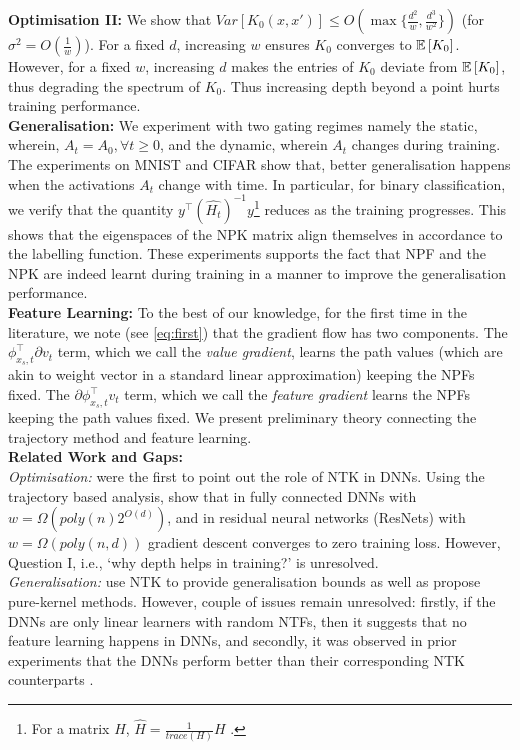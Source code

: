 \textbf{Optimisation II:} We show that $Var\left[K_0(x,x')\right]\leq O(\max\{\frac{d^2}{w}, \frac{d^3}{w^2}\})$ (for $\sigma^2=O(\frac{1}w)$). For a fixed $d$, increasing $w$ ensures $K_0$ converges to $\mathbb{E}\left[K_0\right]$. However, for a fixed $w$, increasing $d$ makes the entries of $K_0$ deviate from $\mathbb{E}\left[K_0\right]$, thus degrading the spectrum of $K_0$. Thus increasing depth beyond a point hurts training performance. \hfill\\
\textbf{Generalisation:} We experiment with two gating regimes namely the static, wherein, $A_t=A_0,\forall t \geq 0$, and the dynamic, wherein $A_t$ changes during training. The experiments on MNIST and CIFAR show that, better generalisation happens when the activations $A_t$ change with time. In particular, for binary classification, we verify that the quantity $y^\top (\widehat{H_t})^{-1}y$\footnote{For a matrix $H$, $\hat{H}=\frac{1}{trace(H)}H$ .} reduces as the training progresses. This shows that the eigenspaces of the NPK matrix align themselves in accordance to the labelling function. These experiments supports the fact that NPF and the NPK are indeed learnt during training in a manner to improve the generalisation performance. \hfill\\
\textbf{Feature Learning:} To the best of our knowledge, for the first time in the literature, we note (see \eqref{eq:first}) that the gradient flow has two components. The $\phi^\top_{x_s,t} {\partial} v_t $ term, which we call the \emph{value gradient}, learns the path values (which are akin to weight vector in a standard linear approximation) keeping the NPFs fixed. The $ {\partial} \phi^\top_{x_s,t} v_t$ term, which we call the \emph{feature gradient} learns the NPFs keeping the path values fixed. We present preliminary theory connecting the trajectory method and feature learning. \hfill\\
\textbf{Related Work and Gaps:} \hfill\\
\emph{Optimisation:} \cite{ntk} were the first to point out the role of NTK in DNNs. Using the trajectory based analysis, \cite{dudnn} show that in fully connected DNNs with $w=\Omega(poly(n)2^{O(d)})$, and in residual neural networks (ResNets) with $w=\Omega(poly(n,d))$ gradient descent converges to zero training loss.  However, Question I, i.e., `why depth helps in training?' is unresolved.\hfill\\%
\emph{Generalisation:} \cite{arora2019exact,arora,cao2019generalization} use NTK to provide generalisation bounds as well as propose pure-kernel methods. However, couple of issues remain unresolved: firstly, if the DNNs are only linear learners with random NTFs, then it suggests that no feature learning happens in DNNs, and secondly, it was observed in prior experiments that the DNNs perform better than their corresponding NTK counterparts \cite{arora2019exact,lee2017deep}. \hfill\\
